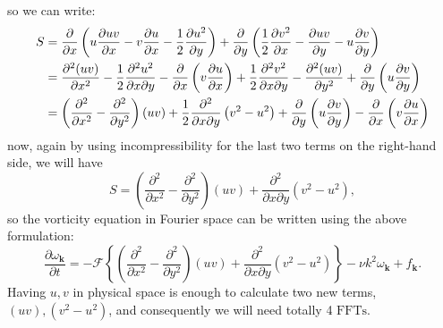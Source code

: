 \documentclass[12pt]{article}
\def\vk{\bm{k}}
\begin{document}
so we can write:
\begin{align}\label{Eq-20}
S &= \dfrac{\partial}{\partial x} \left(u\dfrac{\partial uv}{\partial x}-v\dfrac{\partial u}{\partial x}-\dfrac{1}{2}\dfrac{\partial u^2}{\partial y}\right)+\dfrac{\partial}{\partial y} \left(\dfrac{1}{2}\dfrac{\partial v^2}{\partial x}- \dfrac{\partial uv}{\partial y}-u\dfrac{\partial v}{\partial y}\right) \notag \\
&= \dfrac{\partial^2 (uv)}{\partial x^2}-\dfrac{1}{2}\dfrac{\partial^2 u^2}{\partial x \partial y}-\dfrac{\partial }{\partial x}\left(v\dfrac{\partial u}{\partial x}\right)+\dfrac{1}{2}\dfrac{\partial^2 v^2}{\partial x \partial y}-\dfrac{\partial^2 (uv)}{\partial y^2}+\dfrac{\partial }{\partial y}\left(u\dfrac{\partial v}{\partial y}\right) \\
&= \left(\dfrac{\partial^2}{\partial x^2}-\dfrac{\partial^2}{\partial y^2}\right)(uv)+\dfrac{1}{2}\dfrac{\partial^2}{\partial x \partial y}\left(v^2 - u^2 \right)+\dfrac{\partial }{\partial y}\left(u\dfrac{\partial v}{\partial y}\right)-\dfrac{\partial }{\partial x}\left(v\dfrac{\partial u}{\partial x}\right) \notag
\end{align}
now, again by using incompressibility for the last two terms on the right-hand side, we will have
\begin{equation}\label{Eq-21}
S =\left(\dfrac{\partial^2}{\partial x^2}-\dfrac{\partial^2}{\partial y^2}\right)(uv)+\dfrac{\partial^2}{\partial x \partial y}\left(v^2 - u^2 \right),
\end{equation}
so the vorticity equation in Fourier space can be written using the above formulation:
\begin{equation}\label{Eq-22}
\frac{\partial\omega_{\vk}}{\partial t} =- \mathcal{F}\left\lbrace\left(\dfrac{\partial^2}{\partial x^2}-\dfrac{\partial^2}{\partial y^2}\right)(uv)+\dfrac{\partial^2}{\partial x \partial y}\left(v^2 - u^2 \right)\right\rbrace-\nu{k}^2\omega_{\vk} + f_{\vk}.
\end{equation}
Having $u,v$ in physical space is enough to calculate two new terms, $(uv), (v^2 - u^2)$, and consequently we will need totally 4 $\text{FFTs}$.
\end{document}
